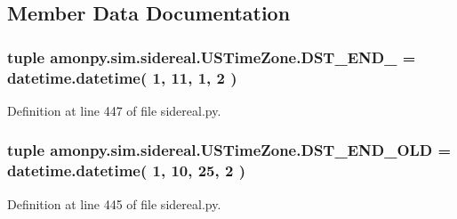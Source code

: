 \subsection{Member Data Documentation}
\hypertarget{classamonpy_1_1sim_1_1sidereal_1_1_u_s_time_zone_a96f5f104143b5b371c91ffbb4c01e1bd}{
\subsubsection[{D\-S\-T\-\_\-\-E\-N\-D\-\_\-2007}]{\setlength{\rightskip}{0pt plus 5cm}tuple amonpy.\-sim.\-sidereal.\-U\-S\-Time\-Zone.\-D\-S\-T\-\_\-\-E\-N\-D\-\_ = datetime.\-datetime( 1, 11, 1, 2 )\hspace{0.3cm}{\ttfamily [static]}}}\label{classamonpy_1_1sim_1_1sidereal_1_1_u_s_time_zone_a96f5f104143b5b371c91ffbb4c01e1bd}


Definition at line 447 of file sidereal.\-py.

\hypertarget{classamonpy_1_1sim_1_1sidereal_1_1_u_s_time_zone_a4bb27c0cb6a5aefb11ed8c9ef9f4a5ea}{
\subsubsection[{D\-S\-T\-\_\-\-E\-N\-D\-\_\-\-O\-L\-D}]{\setlength{\rightskip}{0pt plus 5cm}tuple amonpy.\-sim.\-sidereal.\-U\-S\-Time\-Zone.\-D\-S\-T\-\_\-\-E\-N\-D\-\_\-\-O\-L\-D = datetime.\-datetime( 1, 10, 25, 2 )\hspace{0.3cm}{\ttfamily [static]}}}\label{classamonpy_1_1sim_1_1sidereal_1_1_u_s_time_zone_a4bb27c0cb6a5aefb11ed8c9ef9f4a5ea}


Definition at line 445 of file sidereal.\-py.

